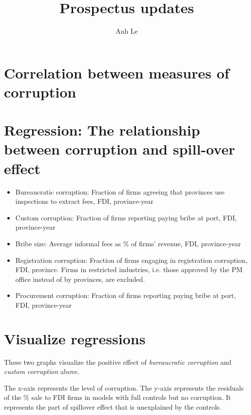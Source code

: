 \documentclass[12pt]{article}
\title{Prospectus updates}
\author{Anh Le}
\begin{document}
\maketitle

\section{Correlation between measures of corruption}





\section{Regression: The relationship between corruption and spill-over effect}

\begin{itemize}
\item Bureaucratic corruption: Fraction of firms agreeing that provinces use inspections to extract fees, FDI, province-year
\item Custom corruption: Fraction of firms reporting paying bribe at port, FDI, province-year
\item Bribe size: Average informal fees as \% of firms' revenue, FDI, province-year
\item Registration corruption: Fraction of firms engaging in registration corruption, FDI, province. Firms in restricted industries, i.e. those approved by the PM office instead of by provinces, are excluded.
\item Procurement corruption: Fraction of firms reporting paying bribe at port, FDI, province-year
\end{itemize}



\section{Visualize regressions}

These two graphs visualize the positive effect of \textit{bureaucratic corruption} and \textit{custom corruption} above.

The x-axis represents the level of corruption. The y-axis represents the residuals of the \% sale to FDI firms in models with full controls but no corruption. It represents the part of spillover effect that is unexplained by the controls.
\end{document}
